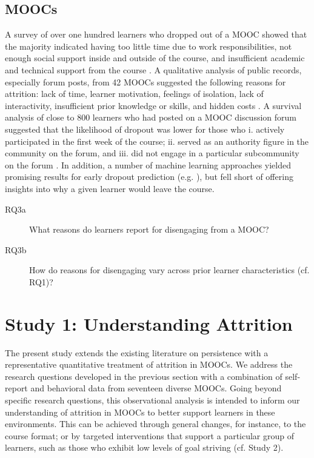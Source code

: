 \documentclass{sigchi}\usepackage[]{graphicx}\usepackage[]{color}
\begin{document}
\subsection{MOOCs}

A survey of over one hundred learners who dropped out of a MOOC showed that the majority indicated having too little time due to work responsibilities, not enough social support inside and outside of the course, and insufficient academic and technical support from the course \cite{gutl2014attrition}. A qualitative analysis of public records, especially forum posts, from 42 MOOCs suggested the following reasons for attrition: lack of time, learner motivation, feelings of isolation, lack of interactivity, insufficient prior knowledge or skills, and hidden costs \cite{khalil2014moocs}. A survival analysis of close to 800 learners who had posted on a MOOC discussion forum suggested that the likelihood of dropout was lower for those who i. actively participated in the first week of the course; ii. served as an authority figure in the community on the forum, and iii. did not engage in a particular subcommunity on the forum \cite{yang2013turn}. In addition, a number of machine learning approaches yielded promising results for early dropout prediction (e.g. \cite{taylor2014likely,halawa2014dropout}), but fell short of offering insights into why a given learner would leave the course.

\begin{description}
\item[RQ3a] What reasons do learners report for disengaging from a MOOC?
\item[RQ3b] How do reasons for disengaging vary across prior learner characteristics (cf. RQ1)?
\end{description}  

\section{Study 1: Understanding Attrition}

The present study extends the existing literature on persistence with a representative quantitative treatment of attrition in MOOCs. We address the research questions developed in the previous section with a combination of self-report and behavioral data from seventeen diverse MOOCs. Going beyond specific research questions, this observational analysis is intended to inform our understanding of attrition in MOOCs to better support learners in these environments. This can be achieved through general changes, for instance, to the course format; or by targeted interventions that support a particular group of learners, such as those who exhibit low levels of goal striving (cf. Study 2).
\end{document}
